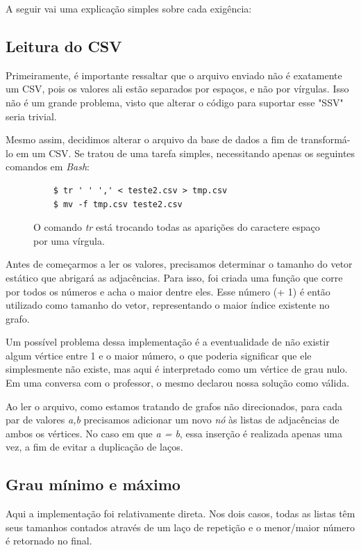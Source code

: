 \documentclass[a4paper, 12pt]{article}
\begin{document}
A seguir vai uma explicação simples sobre cada exigência:

\subsection{Leitura do CSV}
Primeiramente, é importante ressaltar que o arquivo enviado não é exatamente um
CSV, pois os valores ali estão separados por espaços, e não por vírgulas. Isso
não é um grande problema, visto que alterar o código para suportar esse "SSV"
seria trivial.

Mesmo assim, decidimos alterar o arquivo da base de dados a fim de transformá-lo
em um CSV. Se tratou de uma tarefa simples, necessitando apenas os seguintes comandos
em \textit{Bash}:

\begin{figure}[h]
\centering
	\begin{verbatim}
	$ tr ' ' ',' < teste2.csv > tmp.csv
	$ mv -f tmp.csv teste2.csv
	\end{verbatim}
	\vspace{-1.0cm}
	\caption{O comando \textit{tr} está trocando todas as aparições do caractere
	espaço por uma vírgula.}
\end{figure}

Antes de começarmos a ler os valores, precisamos determinar o tamanho do vetor
estático que abrigará as adjacências. Para isso, foi criada uma função que corre
por todos os números e acha o maior dentre eles. Esse número (+ 1) é então utilizado como
tamanho do vetor, representando o maior índice existente no grafo.

Um possível problema dessa implementação é a eventualidade de não existir algum
vértice entre 1 e o maior número, o que poderia significar que ele simplesmente
não existe, mas aqui é interpretado como um vértice de grau nulo. Em uma conversa
com o professor, o mesmo declarou nossa solução como válida.

Ao ler o arquivo, como estamos tratando de grafos não direcionados, para cada par
de valores \textit{a,b} precisamos adicionar um novo \textit{nó} às listas de
adjacências de ambos os vértices. No caso em que \textit{a = b}, essa inserção é
realizada apenas uma vez, a fim de evitar a duplicação de laços.

\subsection{Grau mínimo e máximo}

Aqui a implementação foi relativamente direta. Nos dois casos, todas as listas
têm seus tamanhos contados através de um laço de repetição e o menor/maior número
é retornado no final.
\end{document}
